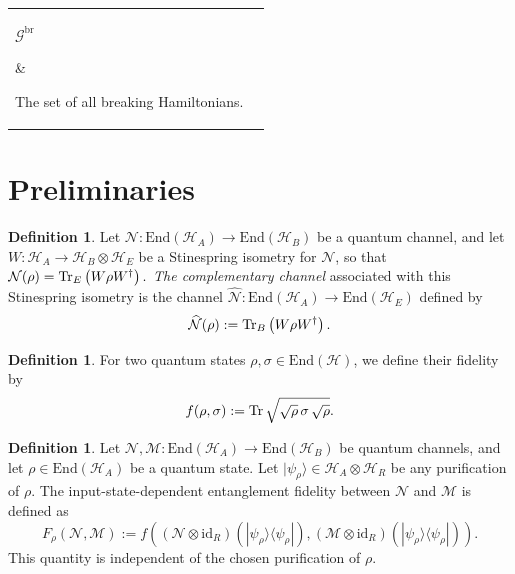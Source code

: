 \documentclass[10pt,twocolumn,superscriptaddress,aps,amsmath,amssymb,citeautoscript,floatfix,prx]{revtex4-2}
\theoremstyle{plain}
\theoremstyle{plain}
\theoremstyle{plain}
\theoremstyle{plain}
\theoremstyle{plain}
\theoremstyle{plain}
\newcommand{\End}{\mathrm{End}}
\theoremstyle{plain}
\theoremstyle{definition}
\newtheorem{smdefinition}[smtheorem]{Definition}
\theoremstyle{plain}
\begin{document}
\begin{appendix}
\begin{tabular}{@{}ll@{}}
\parbox[t]{0.22\textwidth}{$\mathcal{G}^{\text {br }}$} & \parbox[t]{0.72\textwidth}{The set of all breaking Hamiltonians.} \\[0.6em]

\parbox[t]{0.22\textwidth}{$\Pi_{\beta \alpha}(X)$} & \parbox[t]{0.72\textwidth}{The projection of operator $X$ onto the homomorphism space $\mathcal{W}_{\beta \alpha}$, see Definition~\ref{def:projection_onto_block}.} \\[0.6em]

\end{tabular}

\section{Preliminaries}\label{sec:suppl_prelim}

\begin{smdefinition}\label{def:complementary_channel}
Let \(\mathcal N:\End(\mathcal H_A)\to \End(\mathcal H_B)\) be a quantum channel, and let
$
    W:\mathcal H_A\to \mathcal H_B\otimes \mathcal H_E
$
be a Stinespring isometry for \(\mathcal N\), so that
$
    \mathcal N(\rho)=\Tr_E\left(W\rho W^\dagger\right).
$
\textit{The complementary channel} associated with this Stinespring isometry is the channel
$
    \widehat{\mathcal N}:\End(\mathcal H_A)\to \End(\mathcal H_E)
$
defined by
$$
    \widehat{\mathcal N}(\rho)
    :=
    \Tr_B\left(W\rho W^\dagger\right).
$$
\end{smdefinition}

\begin{smdefinition}\label{def:root_fidelity}
For two quantum states \(\rho,\sigma\in \End(\mathcal H)\), we define their fidelity by
\[
    f(\rho,\sigma)
    :=
    \Tr\sqrt{\sqrt{\rho}\,\sigma\,\sqrt{\rho}}.
\]
\end{smdefinition}

\begin{smdefinition}\label{def:rho_entanglement_fidelity}
Let
$
    \mathcal N,\mathcal M:\End(\mathcal H_A)\to \End(\mathcal H_B)
$
be quantum channels, and let \(\rho\in\End(\mathcal H_A)\) be a quantum state. Let
$
    |\psi_\rho\rangle\in \mathcal H_A\otimes \mathcal H_R
$
be any purification of \(\rho\). The input-state-dependent entanglement fidelity between \(\mathcal N\) and \(\mathcal M\) is defined as
\[
    F_\rho(\mathcal N,\mathcal M)
    :=
    f\left(
    (\mathcal N\otimes \mathrm{id}_R)(|\psi_\rho\rangle\langle\psi_\rho|),
    (\mathcal M\otimes \mathrm{id}_R)(|\psi_\rho\rangle\langle\psi_\rho|)
    \right).
\]
This quantity is independent of the chosen purification of \(\rho\).
\end{smdefinition}


\end{appendix}
\end{document}
